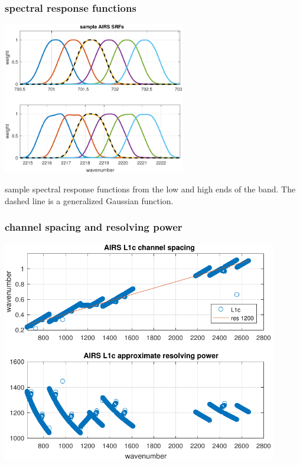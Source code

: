 \begin{frame} %
\frametitle{{\airs} spectral response functions}
\begin{center}
   \includegraphics[width=0.6\textwidth]{figures/airs_sample_SRF.pdf}
 \end{center}
sample {\airs} spectral response functions from the low and high
ends of the band.  The dashed line is a generalized Gaussian
function.
\end{frame} 
\begin{frame} %
\frametitle{channel spacing and resolving power}
\begin{center}
  \includegraphics[width=0.9\textwidth]{figures/airs_L1c_res.pdf}
\end{center}
\end{frame} %
